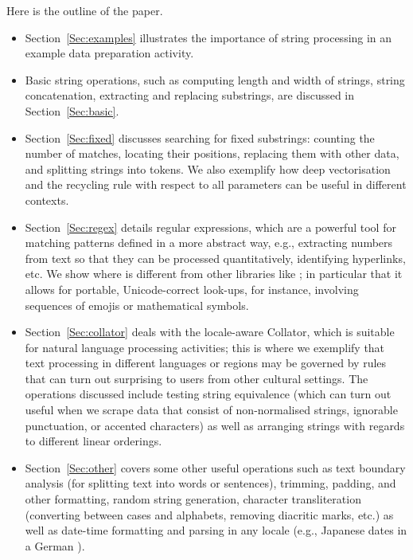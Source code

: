 \documentclass[nojss]{jss}\usepackage[]{graphicx}\usepackage[]{color}
\begin{document}
Here is the outline of the paper.
\begin{itemize}
\item Section~\ref{Sec:examples} illustrates the importance of string
processing in an example data preparation activity.
\item Basic string operations, such as computing length and width of strings,
string concatenation, extracting and replacing substrings, are discussed in Section~\ref{Sec:basic}.
\item Section~\ref{Sec:fixed} discusses searching for fixed substrings:
counting the number of matches,
locating their positions,
replacing them with other data,
and splitting strings into tokens.
We also exemplify how deep vectorisation and the recycling rule with respect
to all parameters can be useful in different contexts.

\item Section~\ref{Sec:regex} details  regular
expressions, which are a powerful tool for matching patterns defined in
a more abstract way, e.g., extracting numbers from text so that they can
be processed quantitatively, identifying hyperlinks, etc.
We show where  is different from other libraries like ;
in particular that it allows for portable, Unicode-correct look-ups,
for instance, involving sequences of emojis or mathematical symbols.

\item Section~\ref{Sec:collator} deals with the locale-aware  Collator,
which is  suitable for natural language processing activities; this is where we exemplify
that text processing in different languages or regions may be governed
by rules that can turn out surprising to users from other cultural settings.
The operations discussed include testing string equivalence (which can
turn out useful when we scrape data that consist of non-normalised strings,
ignorable punctuation, or accented characters) as well as arranging strings
with regards to different linear orderings.

\item Section~\ref{Sec:other} covers some other useful operations such
as text boundary analysis (for splitting text into words or sentences),
trimming, padding, and other formatting,
random string generation,
character transliteration (converting between cases and alphabets, removing diacritic
marks, etc.) as well as
date-time formatting and parsing in any locale (e.g., Japanese dates in a German
).


\end{itemize}
\end{document}

